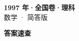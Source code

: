 \documentclass[zihao=-4, a4paper]{ctexart}
\begin{document}
\begin{center}
  {\Large\bfseries 1997 年·全国卷·理科}\\[4pt]
  {\large 数学 · 简答版}
\end{center}
\medskip
{}

\clearpage
{}
\begin{center}{\Large\bfseries 答案速查}\end{center}
\medskip

\end{document}

